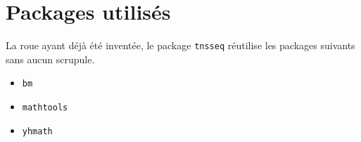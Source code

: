 \documentclass[12pt,a4paper]{article}
\begin{document}
\section{Packages utilisés}

La roue ayant déjà été inventée, le package \verb#tnsseq# réutilise les packages suivants sans aucun scrupule.

\begin{multicols}{4}
    \begin{itemize}
        \item \verb#bm#
        \item \verb#mathtools#
        \item \verb#yhmath#
    \end{itemize}
\end{multicols}
\end{document}
